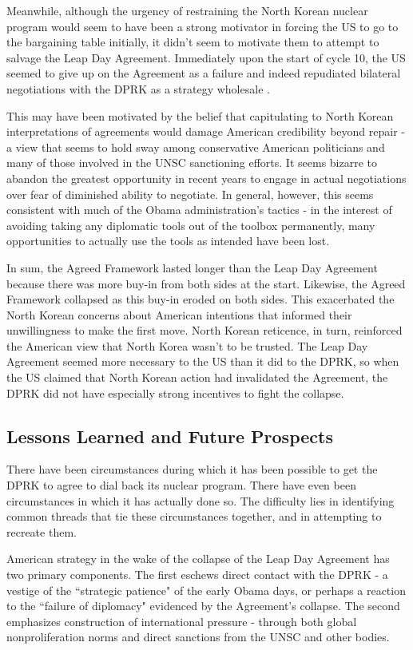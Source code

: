 \documentclass{article}
\begin{document}
Meanwhile, although the urgency of restraining the North Korean nuclear program would seem to have been a strong motivator in forcing the US to go to the bargaining table initially, it didn't seem to motivate them to attempt to salvage the Leap Day Agreement. Immediately upon the start of cycle 10, the US seemed to give up on the Agreement as a failure and indeed repudiated bilateral negotiations with the DPRK as a strategy wholesale \cite{delury}.

This may have been motivated by the belief that capitulating to North Korean interpretations of agreements would damage American credibility beyond repair - a view that seems to hold sway among conservative American politicians and many of those involved in the UNSC sanctioning efforts. It seems bizarre to abandon the greatest opportunity in recent years to engage in actual negotiations over fear of diminished ability to negotiate. In general, however, this seems consistent with much of the Obama administration's tactics - in the interest of avoiding taking any diplomatic tools out of the toolbox permanently, many opportunities to actually use the tools as intended have been lost.

In sum, the Agreed Framework lasted longer than the Leap Day Agreement because there was more buy-in from both sides at the start. Likewise, the Agreed Framework collapsed as this buy-in eroded on both sides. This exacerbated the North Korean concerns about American intentions that informed their unwillingness to make the first move. North Korean reticence, in turn, reinforced the American view that North Korea wasn't to be trusted. The Leap Day Agreement seemed more necessary to the US than it did to the DPRK, so when the US claimed that North Korean action had invalidated the Agreement, the DPRK did not have especially strong incentives to fight the collapse.

\subsection{Lessons Learned and Future Prospects}

There have been circumstances during which it has been possible to get the DPRK to agree to dial back its nuclear program. There have even been circumstances in which it has actually done so. The difficulty lies in identifying common threads that tie these circumstances together, and in attempting to recreate them.

American strategy in the wake of the collapse of the Leap Day Agreement has two primary components. The first eschews direct contact with the DPRK - a vestige of the ``strategic patience" of the early Obama days, or perhaps a reaction to the ``failure of diplomacy" evidenced by the Agreement's collapse. The second emphasizes construction of international pressure - through both global nonproliferation norms and direct sanctions from the UNSC and other bodies.
\end{document}
